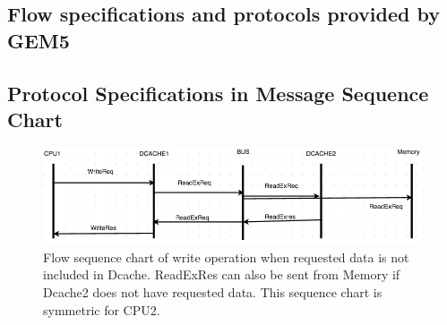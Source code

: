\documentclass[12pt,frontmatter,copyright,thesis]{usfmanus}
\begin{document}
\begin{appendix}

\chapter{Flow specifications and protocols provided by GEM5}
\section{Protocol Specifications in Message Sequence Chart}
\begin{figure}[h]
\centering
 \includegraphics[width=4.5In]{figures/write3.png}
 \caption{\footnotesize Flow sequence chart of write operation when requested data is not included in Dcache. ReadExRes can also be sent from Memory if Dcache2 does not have requested data. This sequence chart is symmetric for CPU2. }
 \label{write3}


\end{figure}
\end{appendix}
\end{document}
